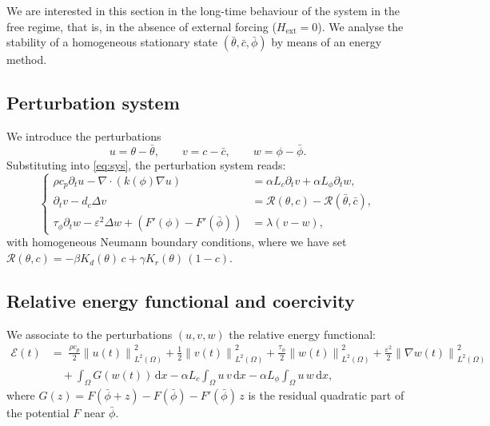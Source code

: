 \documentclass[final,1p,times]{elsarticle}
\newcommand{\dx}{\,\mathrm{d}x}
\numberwithin{equation}{section}
\newcommand{\norm}[1]{\left\|#1\right\|}
\newcommand{\ptn}{\partial_t}
\begin{document}
	We are interested in this section in the long-time behaviour of the system in the free regime, that is, in the absence of external forcing ($H_{\mathrm{ext}}=0$). We analyse the stability of a homogeneous stationary state $(\bar{\theta},\bar{c},\bar{\phi})$ by means of an energy method.
	
	
	\subsection{Perturbation system}
	
	We introduce the perturbations
	\[
	u = \theta - \bar\theta, \qquad v = c - \bar c, \qquad w = \phi - \bar\phi.
	\]
	Substituting into \eqref{eq:sys}, the perturbation system reads:
	\begin{equation}
		\label{eq:uvw}
		\left\{
		\begin{aligned}
			\rho c_p \ptn u - \nabla\cdot(k(\phi)\nabla u)
			&= \alpha L_c \ptn v + \alpha L_\phi \ptn w, \\[4pt]
			\ptn v - d_c \Delta v
			&= \mathcal{R}(\theta,c) - \mathcal{R}(\bar\theta,\bar c), \\[4pt]
			\tau_\phi \ptn w - \varepsilon^2\Delta w
			+ (F'(\phi) - F'(\bar\phi))
			&= \lambda(v - w),
		\end{aligned}
		\right.
	\end{equation}
	with homogeneous Neumann boundary conditions, where we have set
	$\mathcal{R}(\theta,c) = -\beta K_d(\theta)\,c + \gamma K_r(\theta)\,(1-c)$.
	
	\subsection{Relative energy functional and coercivity}
	
	We associate to the perturbations $(u, v, w)$ the relative energy functional:
	\begin{equation}
		\label{eq:energy}
		\begin{aligned}
			\mathcal{E}(t) & = \;
			\frac{\rho c_p}{2}\norm{u(t)}_{L^2(\Omega)}^2
			+ \frac12\norm{v(t)}_{L^2(\Omega)}^2
			+ \frac{\tau_\phi}{2}\norm{w(t)}_{L^2(\Omega)}^2
			+ \frac{\varepsilon^2}{2}\norm{\nabla w(t)}_{L^2(\Omega)}^2 \\
			&\quad + \int_\Omega G(w(t))\dx
			- \alpha L_c \int_\Omega u\,v\dx
			- \alpha L_\phi \int_\Omega u\,w\dx,
		\end{aligned}
	\end{equation}
	where $G(z) = F(\bar\phi + z) - F(\bar\phi) - F'(\bar\phi)\,z$ is the residual quadratic part
	of the potential $F$ near $\bar\phi$.
	
\end{document}
